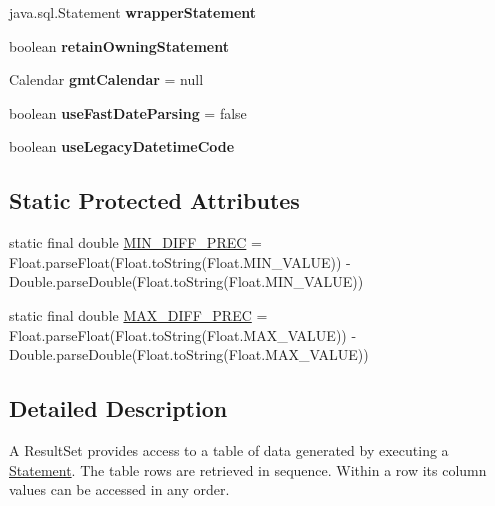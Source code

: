 \begin{DoxyCompactItemize}
java.\+sql.\+Statement {\bfseries wrapper\+Statement}
\item 
\mbox{\label{classcom_1_1mysql_1_1jdbc_1_1_result_set_impl_a74ec70f8105953db3a00b34e5b8ccfdf}} 
boolean {\bfseries retain\+Owning\+Statement}
\item 
\mbox{\label{classcom_1_1mysql_1_1jdbc_1_1_result_set_impl_a991e24fe1c4d5999ae2cdee2fe71d77c}} 
Calendar {\bfseries gmt\+Calendar} = null
\item 
\mbox{\label{classcom_1_1mysql_1_1jdbc_1_1_result_set_impl_a84603eb99a1c714a8b1094d99138dc6a}} 
boolean {\bfseries use\+Fast\+Date\+Parsing} = false
\item 
\mbox{\label{classcom_1_1mysql_1_1jdbc_1_1_result_set_impl_a5ef5f2e98b034326318d97ddc1840f0c}} 
boolean {\bfseries use\+Legacy\+Datetime\+Code}
\end{DoxyCompactItemize}
\subsection*{Static Protected Attributes}
\begin{DoxyCompactItemize}
\item 
static final double \mbox{\hyperlink{classcom_1_1mysql_1_1jdbc_1_1_result_set_impl_a60eba67713322de919cf32696c7c5280}{M\+I\+N\+\_\+\+D\+I\+F\+F\+\_\+\+P\+R\+EC}} = Float.\+parse\+Float(Float.\+to\+String(Float.\+M\+I\+N\+\_\+\+V\+A\+L\+UE)) -\/ Double.\+parse\+Double(Float.\+to\+String(Float.\+M\+I\+N\+\_\+\+V\+A\+L\+UE))
\item 
static final double \mbox{\hyperlink{classcom_1_1mysql_1_1jdbc_1_1_result_set_impl_a137989564b07a7b8082ff300fea60cb9}{M\+A\+X\+\_\+\+D\+I\+F\+F\+\_\+\+P\+R\+EC}} = Float.\+parse\+Float(Float.\+to\+String(Float.\+M\+A\+X\+\_\+\+V\+A\+L\+UE)) -\/ Double.\+parse\+Double(Float.\+to\+String(Float.\+M\+A\+X\+\_\+\+V\+A\+L\+UE))
\end{DoxyCompactItemize}


\subsection{Detailed Description}
A Result\+Set provides access to a table of data generated by executing a \mbox{\hyperlink{interfacecom_1_1mysql_1_1jdbc_1_1_statement}{Statement}}. The table rows are retrieved in sequence. Within a row its column values can be accessed in any order.

